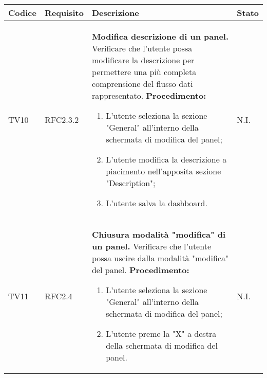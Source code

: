 \begin{table}[!htpb]
	\centering
	\renewcommand{\arraystretch}{2} 
	\begin{tabular}{|l|l|p{10cm}|l|}
		\rowcolor{orange!50}
		\hline
		\textbf{Codice} & \textbf{Requisito}& \textbf{Descrizione} & \textbf{Stato}\\ 
		\hline
		TV10 & RFC2.3.2 &
			\textbf{Modifica descrizione di un panel.}
			\newline
			Verificare che l'utente possa modificare la descrizione per permettere una più completa comprensione del flusso dati rappresentato.
			\newline
			\textbf{Procedimento:}
			\begin{enumerate}\item L'utente seleziona la sezione "General" all'interno della schermata di modifica del panel; 
				\item L’utente modifica la descrizione a piacimento nell’apposita sezione "Description"; 
				\item L'utente salva la dashboard.	
			\end{enumerate}
			& N.I.\\
		\hline
		TV11 & RFC2.4 	&
			\textbf{Chiusura modalità "modifica" di un panel.}
			\newline
			Verificare che l'utente possa uscire dalla modalità "modifica" del panel.
			\newline
			\textbf{Procedimento:}
			\begin{enumerate}\item L'utente seleziona la sezione "General" all'interno della schermata di modifica del panel; 
				\item L’utente preme la "X" a destra della schermata di modifica del panel.
			\end{enumerate}
			& N.I.\\
		\hline
	\end{tabular}
\end{table}
